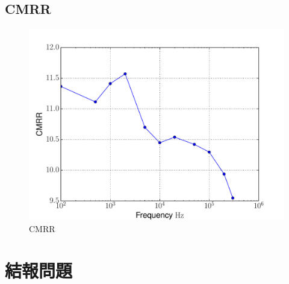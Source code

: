 \documentclass[12pt, a4paper]{article}
\begin{document}
\subsection{CMRR}
\begin{figure}[H]
\begin{center}
  \includegraphics[width=.7\textwidth]{fig_cmrr.pdf}
\end{center}
\caption{CMRR}
\label{fig:}
\end{figure}


\clearpage
\section{結報問題}
\end{document}
